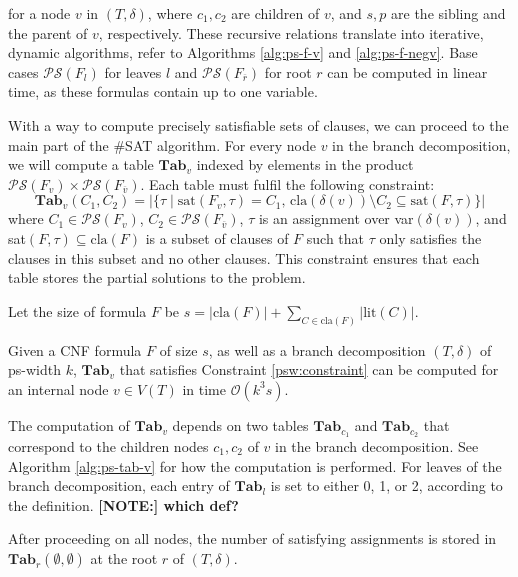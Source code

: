 \noindent
for a node $v$ in $(T, \delta)$, where $c_1, c_2$ are children of $v$, and $s, p$ are the sibling and the parent of $v$, respectively.
These recursive relations translate into iterative, dynamic algorithms, refer to Algorithms \ref{alg:ps-f-v} and \ref{alg:ps-f-negv}.
Base cases $\mathcal{PS}(F_l)$ for leaves $l$ and $\mathcal{PS}(F_{\overline{r}})$ for root $r$ can be computed in linear time, as these formulas contain up to one variable.

With a way to compute precisely satisfiable sets of clauses, we can proceed to the main part of the \#SAT algorithm.
For every node $v$ in the branch decomposition, we will compute a table $\mathbf{Tab}_v$ indexed by elements in the product $\mathcal{PS}(F_v) \times \mathcal{PS}(F_{\overline{v}})$.
Each table must fulfil the following constraint:
\begin{equation}
	\mathbf{Tab}_v(C_1, C_2) = |\{ \tau \; | \; \text{sat}(F_v, \tau) = C_1, \, \text{cla}(\delta(v)) \setminus C_2 \subseteq \text{sat}(F, \tau) \}|
	\label{psw:constraint}
\end{equation}
where $C_1 \in \mathcal{PS}(F_v)$, $C_2 \in \mathcal{PS}(F_{\overline{v}})$, $\tau$ is an assignment over var$(\delta(v))$, and sat$(F,\tau) \subseteq \text{cla}(F)$ is a subset of clauses of $F$ such that $\tau$ only satisfies the clauses in this subset and no other clauses.
This constraint ensures that each table stores the partial solutions to the problem.

Let the size of formula $F$ be $s = |\text{cla}(F)| + \sum_{C \in \text{cla}(F)} |\text{lit}(C)|$.

\begin{lemma}
	Given a CNF formula $F$ of size $s$, as well as a branch decomposition $(T, \delta)$ of ps-width $k$, $\mathbf{Tab}_v$ that satisfies Constraint \ref{psw:constraint} can be computed for an internal node $v \in V(T)$ in time $\mathcal{O}(k^3s)$.
\end{lemma}

The computation of $\mathbf{Tab}_v$ depends on two tables $\mathbf{Tab}_{c_1}$ and $\mathbf{Tab}_{c_2}$ that correspond to the children nodes $c_1, c_2$ of $v$ in the branch decomposition.
See Algorithm \ref{alg:ps-tab-v} for how the computation is performed.
For leaves of the branch decomposition, each entry of $\mathbf{Tab}_l$ is set to either 0, 1, or 2, according to the definition. \textbf{[NOTE:] which def?}

After proceeding on all nodes, the number of satisfying assignments is stored in $\mathbf{Tab}_r(\emptyset, \emptyset)$ at the root $r$ of $(T, \delta)$.

